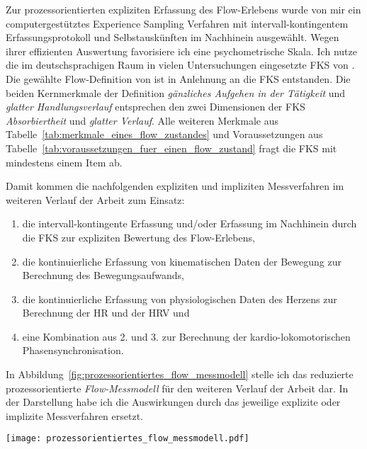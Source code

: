 Zur prozessorientierten expliziten Erfassung des Flow-Erlebens wurde von mir ein computergestütztes Experience Sampling Verfahren mit intervall-kontingentem Erfassungsprotokoll und Selbstauskünften im Nachhinein ausgewählt. Wegen ihrer effizienten Auswertung favorisiere ich eine psychometrische Skala. Ich nutze die im deutschsprachigen Raum in vielen Untersuchungen eingesetzte \ac{FKS} von \citet{Rheinberg2003}. Die gewählte Flow-Definition von \citet{Henk2014} ist in Anlehnung an die \ac{FKS} entstanden. Die beiden Kernmerkmale der Definition \emph{gänzliches Aufgehen in der Tätigkeit} und \emph{glatter Handlungsverlauf} entsprechen den zwei Dimensionen der \ac{FKS} \emph{Absorbiertheit} und \emph{glatter Verlauf}. Alle weiteren Merkmale aus Tabelle~\ref{tab:merkmale_eines_flow_zustandes} und Voraussetzungen aus Tabelle~\ref{tab:voraussetzungen_fuer_einen_flow_zustand} fragt die \ac{FKS} mit mindestens einem Item ab. 

Damit kommen die nachfolgenden expliziten und impliziten Messverfahren im weiteren Verlauf der Arbeit zum Einsatz:
\begin{enumerate}
	
	\item die intervall-kontingente Erfassung und/oder Erfassung im Nachhinein durch die \ac{FKS} zur expliziten Bewertung des Flow-Erlebens,

	\item die kontinuierliche Erfassung von kinematischen Daten der Bewegung zur Berechnung des Bewegungsaufwands, 

	\item die kontinuierliche Erfassung von physiologischen Daten des Herzens zur Berechnung der \ac{HR} und der \ac{HRV} und

	\item eine Kombination aus 2. und 3. zur Berechnung der kardio-lokomotorischen Phasensynchronisation.
\end{enumerate}

In Abbildung~\ref{fig:prozessorientiertes_flow_messmodell} stelle ich das reduzierte prozessorientierte \emph{Flow-Messmodell} für den weiteren Verlauf der Arbeit dar. In der Darstellung habe ich die Auswirkungen durch das jeweilige explizite oder implizite Messverfahren ersetzt. 
\begin{sidewaysfigure}
	\texttt{[image: prozessorientiertes\_flow\_messmodell.pdf]} \caption[Das prozessorientierte Flow-Messmodell für die Entwicklung eines impliziten Messverfahrens des Flow-Erlebens]{Das prozessorientierte Flow-Messmodell für die Entwicklung eines impliziten Messverfahrens des Flow-Erlebens -- die Auswirkungen wurden durch das jeweilige explizite oder implizite Messverfahren ersetzt. Die explizite Befragung durch die \ac{FKS} findet nicht mehr im Prozess statt.} \label{fig:prozessorientiertes_flow_messmodell} 
\end{sidewaysfigure}


